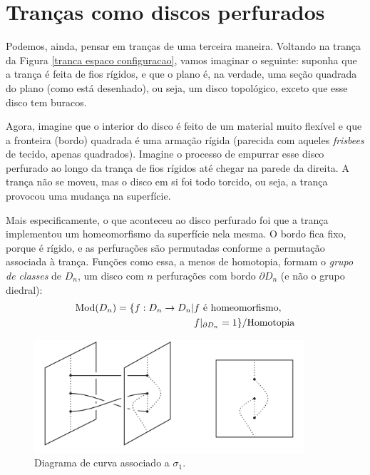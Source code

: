 	\section{Tranças como discos perfurados}\label{secao trancas como discos perfurados}
	\hspace{12pt} Podemos, ainda, pensar em tranças de uma terceira maneira. Voltando na trança da Figura \eqref{tranca espaco configuracao}, vamos imaginar o seguinte: suponha que a trança é feita de fios rígidos, e que o plano é, na verdade, uma seção quadrada do plano (como está desenhado), ou seja, um disco topológico, exceto que esse disco tem buracos.
	\par\vspace{0.3cm} Agora, imagine que o interior do disco é feito de um material muito flexível e que a fronteira (bordo) quadrada é uma armação rígida (parecida com aqueles \textit{frisbees} de tecido, apenas quadrados). Imagine o processo de empurrar esse disco perfurado ao longo da trança de fios rígidos até chegar na parede da direita. A trança não se moveu, mas o disco em si foi todo torcido, ou seja, a trança provocou uma mudança na superfície.
	\par\vspace{0.3cm} Mais especificamente, o que aconteceu ao disco perfurado foi que a trança implementou um homeomorfismo da superfície nela mesma. O bordo fica fixo, porque é rígido, e as perfurações são permutadas conforme a permutação associada à trança. Funções como essa, a menos de homotopia, formam o \textit{grupo de classes} de $D_n$, um disco com $n$ perfurações com bordo $\partial D_n$ (e não o grupo diedral):
	\begin{align*}
	\operatorname{Mod}(D_n) = \{ f:D_n\to D_n|& f\text{ é homeomorfismo}, \\
	&f|_{\partial D_n} = 1 \}/\text{Homotopia}
	\end{align*}
	
	\begin{figure}[H]
		\begin{center}
			\includegraphics[width=10cm]{Images/tranca_disco_perfurado.png}
		\end{center}\caption{Diagrama de curva associado a $\sigma_1$.}
		\label{tranca disco perfurado}
	\end{figure}
	

